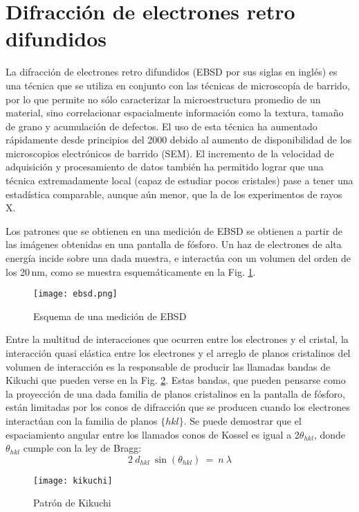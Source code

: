 \section{Difracción de electrones retro difundidos}\label{S:EBSD}
La difracción de electrones retro difundidos (EBSD por sus siglas en inglés) es una técnica que se utiliza en conjunto con las técnicas de microscopía de barrido, por lo que permite no sólo caracterizar la microestructura promedio de un material, sino correlacionar espacialmente información como la textura, tamaño de grano y acumulación de defectos.
El uso de esta técnica ha aumentado rápidamente desde principios del 2000 debido al aumento de disponibilidad de los microscopios electrónicos de barrido (SEM). El incremento de la velocidad de adquisición y procesamiento de datos también ha permitido lograr que una técnica extremadamente local (capaz de estudiar pocos cristales) pase a tener una estadística comparable, aunque aún menor, que la de los experimentos de rayos X.


Los patrones que se obtienen en una medición de EBSD se obtienen a partir de las imágenes obtenidas en una pantalla de fósforo. Un haz de electrones de alta energía incide sobre una dada muestra, e interactúa con un volumen del orden de los 20\,nm, como se muestra esquemáticamente en la Fig. \ref{fig:ebsd}.

\begin{figure}[!htb]
  \centering
  \texttt{[image: ebsd.png]}
  \caption{Esquema de una medición de EBSD}
  \label{fig:ebsd}
\end{figure}

Entre la multitud de interacciones que ocurren entre los electrones y el cristal, la interacción quasi elástica entre los electrones y el arreglo de planos cristalinos del volumen de interacción es la responsable de producir las llamadas bandas de Kikuchi que pueden verse en la Fig. \ref{fig:kikuchi}.
Estas bandas, que pueden pensarse como la proyección de una dada familia de planos cristalinos en la pantalla de fósforo, están limitadas por los conos de difracción que se producen cuando los electrones interactúan con la familia de planos $\{ hkl \}$. Se puede demostrar que el espaciamiento angular entre los llamados conos de Kossel es igual a 2$\theta_{hkl}$, donde $\theta_{hkl}$ cumple con la ley de Bragg:
\begin{equation}
  2 \ d_{hkl} \ \sin(\theta_{hkl}) \ = \ n \ \lambda
  \label{eq:BraggEBSD}
\end{equation}
\noindent
\begin{figure}[!htb]
  \centering
  \texttt{[image: kikuchi]}
  \caption{Patrón de Kikuchi}
  \label{fig:kikuchi}
\end{figure}


